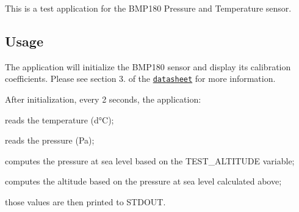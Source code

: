 This is a test application for the B\+M\+P180 Pressure and Temperature sensor.

\subsection*{Usage}

The application will initialize the B\+M\+P180 sensor and display its calibration coefficients. Please see section 3. of the \href{https://www.adafruit.com/datasheets/BST-BMP180-DS000-09.pdf}{\tt datasheet} for more information.

After initialization, every 2 seconds, the application\+:
\begin{DoxyItemize}
\item reads the temperature (d°C);
\item reads the pressure (Pa);
\item computes the pressure at sea level based on the T\+E\+S\+T\+\_\+\+A\+L\+T\+I\+T\+U\+DE variable;
\item computes the altitude based on the pressure at sea level calculated above;
\item those values are then printed to S\+T\+D\+O\+UT. 
\end{DoxyItemize}